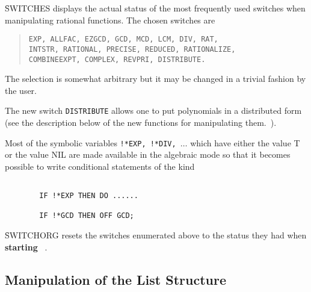 \f{SWITCHES} displays the actual status of the most frequently used switches
when manipulating rational functions. The chosen switches are
\begin{quotation}
\noindent
{\tt EXP, ALLFAC, EZGCD, GCD, MCD, LCM, DIV, RAT, \\%
INTSTR, RATIONAL, PRECISE, REDUCED, RATIONALIZE, \\%
COMBINEEXPT, COMPLEX, REVPRI, DISTRIBUTE.}
\end{quotation}

The selection is somewhat arbitrary but it may be changed in a trivial
fashion by the user.

The new switch {\tt DISTRIBUTE} allows one to put polynomials in a
distributed form (see the description below of
the new functions for manipulating  them.~).

Most of the symbolic variables {\tt !*EXP, !*DIV, $\ldots$}
which have either the value T or the value NIL are made available in the
algebraic mode so that it becomes possible to write conditional
statements of the kind
\begin{verbatim}

        IF !*EXP THEN DO ......

        IF !*GCD THEN OFF GCD;

\end{verbatim}
\f{SWITCHORG} resets  the switches enumerated above to the status
they had when {\bf starting} \REDUCE\ .
\subsection{Manipulation of the List Structure}

